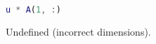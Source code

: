 \begin{lstlisting}[language=Matlab]
u * A(1, :)
\end{lstlisting}

\begin{solution}
Undefined (incorrect dimensions).
\end{solution}